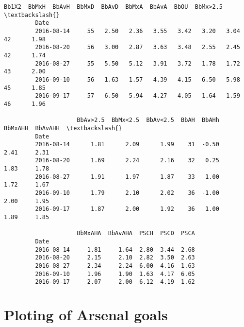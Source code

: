 \documentclass[11pt]{article}
\begin{document}
\begin{Verbatim}[commandchars=\\\{\}]
                     Bb1X2  BbMxH  BbAvH  BbMxD  BbAvD  BbMxA  BbAvA  BbOU  BbMx>2.5  \textbackslash{}
         Date                                                                          
         2016-08-14     55   2.50   2.36   3.55   3.42   3.20   3.04    42      1.98   
         2016-08-20     56   3.00   2.87   3.63   3.48   2.55   2.45    42      1.74   
         2016-08-27     55   5.50   5.12   3.91   3.72   1.78   1.72    43      2.00   
         2016-09-10     56   1.63   1.57   4.39   4.15   6.50   5.98    45      1.85   
         2016-09-17     57   6.50   5.94   4.27   4.05   1.64   1.59    46      1.96   
         
                     BbAv>2.5  BbMx<2.5  BbAv<2.5  BbAH  BbAHh  BbMxAHH  BbAvAHH  \textbackslash{}
         Date                                                                      
         2016-08-14      1.81      2.09      1.99    31  -0.50     2.41     2.31   
         2016-08-20      1.69      2.24      2.16    32   0.25     1.83     1.78   
         2016-08-27      1.91      1.97      1.87    33   1.00     1.72     1.67   
         2016-09-10      1.79      2.10      2.02    36  -1.00     2.00     1.95   
         2016-09-17      1.87      2.00      1.92    36   1.00     1.89     1.85   
         
                     BbMxAHA  BbAvAHA  PSCH  PSCD  PSCA  
         Date                                            
         2016-08-14     1.81     1.64  2.80  3.44  2.68  
         2016-08-20     2.15     2.10  2.82  3.50  2.63  
         2016-08-27     2.34     2.24  6.00  4.16  1.63  
         2016-09-10     1.96     1.90  1.63  4.17  6.05  
         2016-09-17     2.07     2.00  6.12  4.19  1.62  
\end{Verbatim}
            
    \hypertarget{ploting-of-arsenal-goals}{%
\section{Ploting of Arsenal goals}\label{ploting-of-arsenal-goals}}
\end{document}
